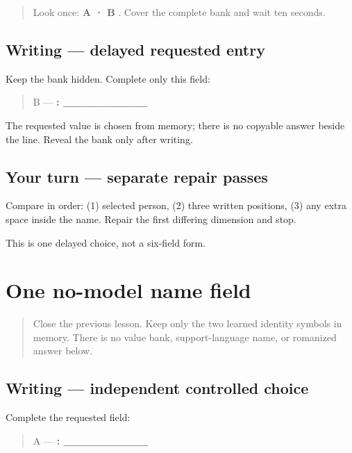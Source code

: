 \begin{quote}
Look once: \textbf{A  · B }. Cover the complete bank and wait ten seconds.
\end{quote}

\subsection*{Writing — delayed requested entry}
Keep the bank hidden. Complete only this field:

\begin{quote}
B — \textbf{: \_\_\_\_\_\_\_\_\_\_}
\end{quote}

The requested value is chosen from memory; there is no copyable answer beside the line. Reveal the bank only after writing.

\subsection*{Your turn — separate repair passes}
Compare in order: (1) selected person, (2) three written positions, (3) any extra space inside the name. Repair the first differing dimension and stop.

\begin{tcolorbox}[breakable,colback=teal!4,colframe=teal!35!black,title={Before you move on}]
This is one delayed choice, not a six-field form.
\end{tcolorbox}
\section[\texorpdfstring{\pa{ਨਾਂ}: \_\_\_\_\_\_\_\_\_\_ (name field)}{ਨਾਂ: \_\_\_\_\_\_\_\_\_\_ (name field)}]{One no-model name field}

\label{lesson:PA-W02-name-no-model}



\begin{quote}
Close the previous lesson. Keep only the two learned identity symbols in memory. There is no value bank, support-language name, or romanized answer below.
\end{quote}

\subsection*{Writing — independent controlled choice}
Complete the requested field:

\begin{quote}
A — \textbf{: \_\_\_\_\_\_\_\_\_\_}
\end{quote}

